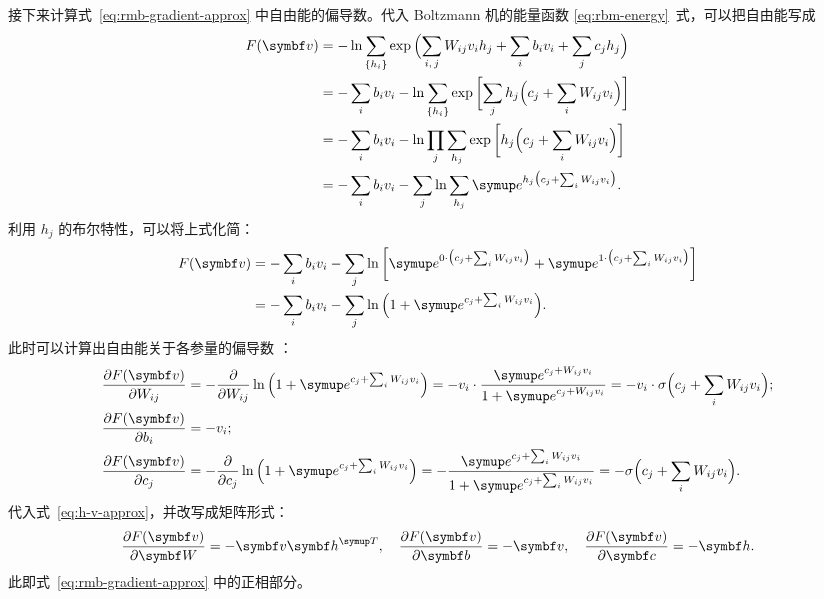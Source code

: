 接下来计算式~\eqref{eq:rmb-gradient-approx} 中自由能的偏导数。代入 Boltzmann 机的能量函数
\eqref{eq:rbm-energy}~式，可以把自由能写成
\begin{align}
  F(\bm{v})
  &= - \ln \sum_{\q{h_i}}
       \exp\qty\Big(\sum_{i,\,j} W_{ij} v_i h_j + \sum_i b_i v_i + \sum_j c_j h_j) \notag \\
  &= - \sum_i b_i v_i
     - \ln \sum_{\q{h_i}} \exp\qty\bigg[\sum_j h_j \qty\Big(c_j + \sum_i W_{ij} v_i)] \notag \\
  &= - \sum_i b_i v_i
     - \ln \prod_j \sum_{h_j} \exp\qty\bigg[h_j \qty\Big(c_j + \sum_i W_{ij} v_i)] \notag \\
  &= - \sum_i b_i v_i
     - \sum_j \ln \sum_{h_j} \ee^{h_j \qty\big(c_j + \sum_i W_{ij} v_i)}.
\end{align}
利用 $h_j$ 的布尔特性，可以将上式化简：
\begin{align}
  F(\bm{v})
  &= - \sum_i b_i v_i - \sum_j \ln
       \qty\bigg[  \ee^{0 \cdot \qty\big(c_j + \sum_i W_{ij} v_i)}
                 + \ee^{1 \cdot \qty\big(c_j + \sum_i W_{ij} v_i)}] \notag \\
  &= - \sum_i b_i v_i - \sum_j \ln \qty\Big(1 + \ee^{c_j + \sum_i W_{ij} v_i}).
\end{align}
此时可以计算出自由能关于各参量的偏导数 \cite{rbmonline}：
\begin{align}
  \pdv{F(\bm{v})}{W_{ij}} &= - \pdv{W_{ij}} \ln \qty\Big(1+\ee^{c_j+\sum_iW_{ij}v_i})
                           = - v_i \cdot \frac{\ee^{c_j+W_{ij}v_i}}{1+\ee^{c_j+W_{ij}v_i}}
                           = - v_i \cdot \sigma\qty\Big(c_j+\sum_iW_{ij}v_i); \\
  \pdv{F(\bm{v})}{b_i}    &= - v_i; \\
  \pdv{F(\bm{v})}{c_j}    &= - \pdv{c_j} \ln \qty\Big(1+\ee^{c_j+\sum_iW_{ij}v_i})
                           = - \frac{\ee^{c_j+\sum_iW_{ij}v_i}}{1+\ee^{c_j+\sum_iW_{ij}v_i}}
                           = - \sigma\qty\Big(c_j+\sum_iW_{ij}v_i).
\end{align}
代入式~\eqref{eq:h-v-approx}，并改写成矩阵形式：
\begin{equation}
  \pdv{F(\bm{v})}{\bm{W}} = - \bm{v} \bm{h}^\trans \qc
  \pdv{F(\bm{v})}{\bm{b}} = - \bm{v} \qc
  \pdv{F(\bm{v})}{\bm{c}} = - \bm{h}.
\end{equation}
此即式~\eqref{eq:rmb-gradient-approx} 中的正相部分。

